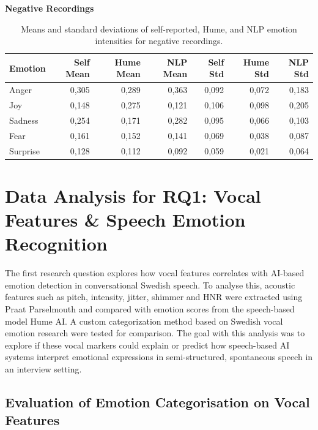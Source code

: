 \begin{table}[H]
    \centering
    \caption*{\textbf{Negative Recordings}}
    \begin{tabular}{lrrrrrr}
      \toprule
      \textbf{Emotion} & \textbf{Self Mean} & \textbf{Hume Mean} & \textbf{NLP Mean} & \textbf{Self Std} & \textbf{Hume Std} & \textbf{NLP Std} \\
      \midrule
      Anger    & 0,305 & 0,289 & 0,363 & 0,092 & 0,072 & 0,183 \\
      Joy      & 0,148 & 0,275 & 0,121 & 0,106 & 0,098 & 0,205 \\
      Sadness  & 0,254 & 0,171 & 0,282 & 0,095 & 0,066 & 0,103 \\
      Fear     & 0,161 & 0,152 & 0,141 & 0,069 & 0,038 & 0,087 \\
      Surprise & 0,128 & 0,112 & 0,092 & 0,059 & 0,021 & 0,064 \\
      \bottomrule
    \end{tabular}
    \caption{Means and standard deviations of self-reported, Hume, and NLP emotion intensities for negative recordings.}
    \label{tab:rq3_emotion-stats_neg}
  \end{table}


\section{Data Analysis for RQ1: Vocal Features \& Speech Emotion Recognition}
The first research question explores how vocal features correlates with AI-based emotion detection in conversational Swedish speech. 
To analyse this, acoustic features such as pitch, intensity, jitter, shimmer and HNR were extracted using Praat Parselmouth and compared with emotion 
scores from the speech-based model Hume AI. A custom categorization method based on Swedish vocal emotion research \autocite{Ekberg2023} were tested for comparison. 
The goal with this analysis was to explore if these vocal markers could explain or predict how speech-based AI systems interpret emotional expressions in 
semi-structured, spontaneous speech in an interview setting. 

\subsection{Evaluation of Emotion Categorisation on Vocal Features}

